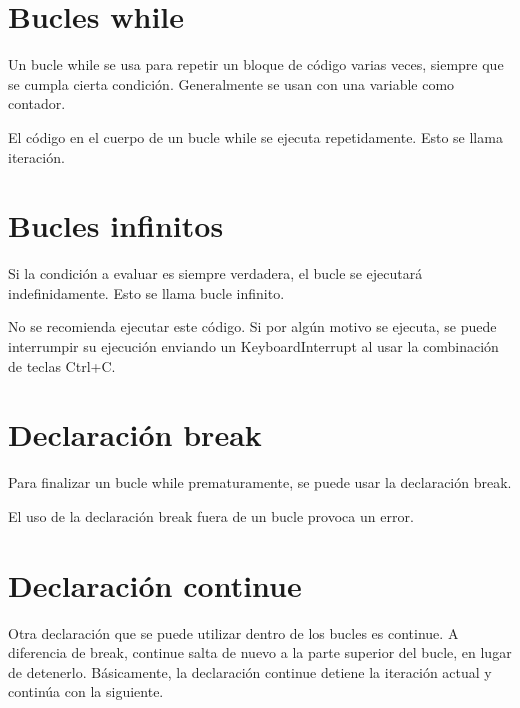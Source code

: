 \documentclass{report}
\begin{document}
{\section{Bucles while}

Un bucle while se usa para repetir un bloque de código varias veces, siempre que se cumpla cierta condición. Generalmente se usan con una variable como contador.


El código en el cuerpo de un bucle while se ejecuta repetidamente. Esto se llama iteración.


\section{Bucles infinitos}

Si la condición a evaluar es siempre verdadera, el bucle se ejecutará indefinidamente. Esto se llama bucle infinito.


No se recomienda ejecutar este código. Si por algún motivo se ejecuta, se puede interrumpir su ejecución enviando un KeyboardInterrupt al usar la combinación de teclas Ctrl+C.

\section{Declaración break}

Para finalizar un bucle while prematuramente, se puede usar la declaración break.


El uso de la declaración break fuera de un bucle provoca un error.


\section{Declaración continue}

Otra declaración que se puede utilizar dentro de los bucles es continue. A diferencia de break, continue salta de nuevo a la parte superior del bucle, en lugar de detenerlo. Básicamente, la declaración continue detiene la iteración actual y continúa con la siguiente.


}
\end{document}
